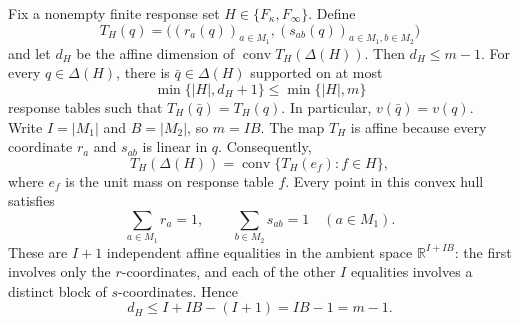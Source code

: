 Fix a nonempty finite response set \(H\in\{F_\kappa,F_\infty\}\).  Define
\[
 T_H(q)=\bigl((r_a(q))_{a\in M_1},(s_{ab}(q))_{a\in M_1,b\in M_2}\bigr)
\]
and let \(d_H\) be the affine dimension of \(\operatorname{conv}T_H(\Delta(H))\).  Then \(d_H\le m-1\).  For every \(q\in\Delta(H)\), there is \(\bar q\in\Delta(H)\) supported on at most
\[
 \min\{|H|,d_H+1\}\le\min\{|H|,m\}
\]
response tables such that \(T_H(\bar q)=T_H(q)\).  In particular, \(v(\bar q)=v(q)\).
Write \(I=|M_1|\) and \(B=|M_2|\), so \(m=IB\).  The map \(T_H\) is affine because every coordinate \(r_a\) and \(s_{ab}\) is linear in \(q\).  Consequently,
\[
 T_H(\Delta(H))
 =\operatorname{conv}\{T_H(e_f):f\in H\},
\]
where \(e_f\) is the unit mass on response table \(f\).  Every point in this convex hull satisfies
\[
 \sum_{a\in M_1}r_a=1,
 \qquad
 \sum_{b\in M_2}s_{ab}=1\quad(a\in M_1).
\]
These are \(I+1\) independent affine equalities in the ambient space \(\mathbb R^{I+IB}\): the first involves only the \(r\)-coordinates, and each of the other \(I\) equalities involves a distinct block of \(s\)-coordinates.  Hence
\[
 d_H\le I+IB-(I+1)=IB-1=m-1.
\]

